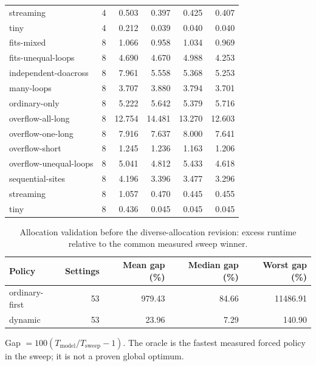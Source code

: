 \begin{center}
\begin{longtable}{lrrrrr}
streaming & 4 & 0.503 & 0.397 & 0.425 & 0.407 \\
tiny & 4 & 0.212 & 0.039 & 0.040 & 0.040 \\
fits-mixed & 8 & 1.066 & 0.958 & 1.034 & 0.969 \\
fits-unequal-loops & 8 & 4.690 & 4.670 & 4.988 & 4.253 \\
independent-doacross & 8 & 7.961 & 5.558 & 5.368 & 5.253 \\
many-loops & 8 & 3.707 & 3.880 & 3.794 & 3.701 \\
ordinary-only & 8 & 5.222 & 5.642 & 5.379 & 5.716 \\
overflow-all-long & 8 & 12.754 & 14.481 & 13.270 & 12.603 \\
overflow-one-long & 8 & 7.916 & 7.637 & 8.000 & 7.641 \\
overflow-short & 8 & 1.245 & 1.236 & 1.163 & 1.206 \\
overflow-unequal-loops & 8 & 5.041 & 4.812 & 5.433 & 4.618 \\
sequential-sites & 8 & 4.196 & 3.396 & 3.477 & 3.296 \\
streaming & 8 & 1.057 & 0.470 & 0.445 & 0.455 \\
tiny & 8 & 0.436 & 0.045 & 0.045 & 0.045 \\
\bottomrule
\end{longtable}
\end{center}
\begin{table}[htbp]\centering
\small
\begin{tabular}{lrrrr}
\toprule
Policy & Settings & Mean gap (\%) & Median gap (\%) & Worst gap (\%) \\
\midrule
ordinary-first & 53 & 979.43 & 84.66 & 11486.91 \\
dynamic & 53 & 23.96 & 7.29 & 140.90 \\
\bottomrule
\end{tabular}
\caption{Allocation validation before the diverse-allocation revision: excess runtime relative to the common measured sweep winner.}\label{tab:utb-original-validation}
\par\medskip\begin{minipage}{0.98\linewidth}\footnotesize Gap $=100(T_{\mathrm{model}}/T_{\mathrm{sweep}}-1)$. The oracle is the fastest measured forced policy in the sweep; it is not a proven global optimum.\end{minipage}
\end{table}
